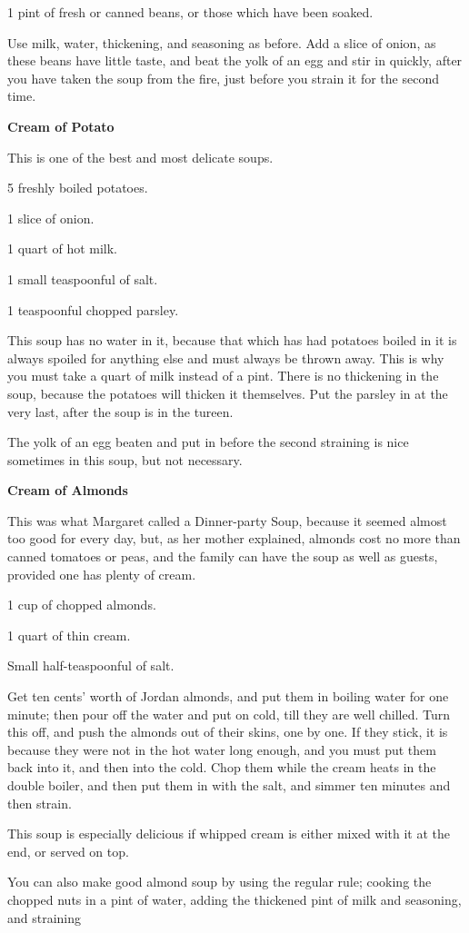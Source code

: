 \documentclass[11pt]{book}
\newcommand{\indpar}{\par\noindent\hspace*{\parindent}}
\newcommand{\ingredient}{\indpar}
\newcommand{\instruction}{\indpar}
\newenvironment{RecipeTitle}{\medskip\begin{center}\large\bf }{\end{center}\smallskip}
\begin{document}
\ingredient  1 pint of fresh or canned beans, or those which have
been soaked.
\instruction
  Use milk, water, thickening, and seasoning as before.
Add a slice of onion, as these beans have little taste,
and beat the yolk of an egg and stir in quickly, after
you have taken the soup from the fire, just before you
strain it for the second time.
\begin{RecipeTitle}
Cream of Potato\label{cream_of_potato}
\end{RecipeTitle}
\instruction
  This is one of the best and most delicate soups.
\ingredient  5 freshly boiled potatoes.
\ingredient  1 slice of onion.
\ingredient  1 quart of hot milk.
\ingredient  1 small teaspoonful of salt.
\ingredient  1 teaspoonful chopped parsley.
\instruction
  This soup has no water in it, because that which has had
potatoes boiled in it is always spoiled for anything else
and must always be thrown away.  This is why you must take
a quart of milk instead of a pint.  There is no thickening
in the soup, because the potatoes will thicken it themselves.
Put the parsley in at the very last, after the soup is
in the tureen.
\instruction
  The yolk of an egg beaten and put in before the second
straining is nice sometimes in this soup, but not necessary.
\begin{RecipeTitle}
Cream of Almonds\label{cream_of_almonds}
\end{RecipeTitle}
\instruction
  This was what Margaret called a Dinner-party Soup, because
it seemed almost too good for every day, but, as her mother
explained, almonds cost no more than canned tomatoes or peas,
and the family can have the soup as well as guests, provided
one has plenty of cream.
\ingredient  1 cup of chopped almonds.
\ingredient  1 quart of thin cream.
\ingredient  Small half-teaspoonful of salt.
\instruction
  Get ten cents' worth of Jordan almonds, and put them in
boiling water for one minute; then pour off the water and
put on cold, till they are well chilled.  Turn this off,
and push the almonds out of their skins, one by one. If
they stick, it is because they were not in the hot water
long enough, and you must put them back into it, and then
into the cold.  Chop them while the cream heats in the
double boiler, and then put them in with the salt, and
simmer ten minutes and then strain.
\instruction
  This soup is especially delicious if whipped cream is
either mixed with it at the end, or served on top.
\instruction
  You can also make good almond soup by using the regular
rule; cooking the chopped nuts in a pint of water, adding
the thickened pint of milk and seasoning, and straining
\end{document}
